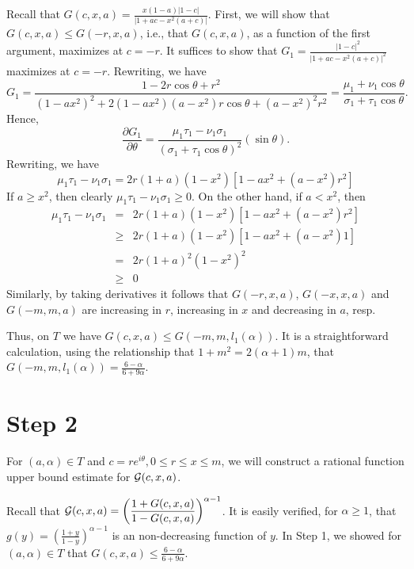 \documentclass[12pt]{article}
\newcommand{\ds}{\displaystyle}
\begin{document}
Recall that ${\ds G(c,x,a) = \frac{x(1-a)|1-c|}{|1+ac-x^2(a+c)|}}$.   
First, we will show that ${ G}(c,x,a) \le { G}(-r,x,a)$, i.e., that ${ G}(c,x,a)$, as a function of the first argument, maximizes at $c = -r$.  
It suffices to show that ${\ds G_1 = \frac{|1-c|^2}{|1+ac-x^2(a+c)|^2}}$ maximizes at $c = -r$.  
Rewriting, we have 
$$
G_1 = \frac{1-2r\cos\theta + r^2}{(1-ax^2)^2 + 2(1-ax^2)(a-x^2)r\cos\theta + (a-x^2)^2r^2} = \frac{\mu_1 + \nu_1 \cos\theta}{\sigma_1 + \tau_1 \cos \theta}.
$$
Hence, 
$$
\frac{\partial G_1}{\partial \theta} = \frac{\mu_1\tau_1 - \nu_1\sigma_1}{(\sigma_1 + \tau_1 \cos\theta)^2}(\sin\theta).
$$
Rewriting, we have
$$
\mu_1\tau_1 - \nu_1\sigma_1 = 2r(1+a)(1-x^2)[1-ax^2 + (a-x^2)r^2]
$$
If $a \ge x^2$, then clearly $\mu_1\tau_1 - \nu_1\sigma_1 \ge 0$.  On the other hand, if $a < x^2$, then
\begin{eqnarray*}
\mu_1\tau_1 - \nu_1\sigma_1 &=& 2r(1+a)(1-x^2)[1-ax^2 + (a-x^2)r^2] \\
                    &\ge& 2r(1+a)(1-x^2)[1-ax^2 + (a-x^2)1] \\
                    &=& 2r (1+a)^2(1-x^2)^2 \\
                    &\ge& 0
\end{eqnarray*}
\vspace{0.05in}
Similarly, by taking derivatives it follows that ${ G}(-r,x,a)$, ${ G}(-x,x,a)$ and ${ G}(-m,m,a)$ are increasing in $r$, increasing in $x$ and decreasing in $a$, resp.

\vspace{0.05in}

Thus, on $T$ we have ${ G}(c,x,a) \le { G}(-m,m,l_1(\alpha))$.  It is a straightforward calculation, using the relationship that $1 + m^2 = 2(\alpha+1)m$, that 
${\ds {G}(-m,m,l_1(\alpha))= \frac{6-\alpha}{6+9\alpha}}$.  


\section{Step 2}

For $(a,\alpha) \in T$ and $c = re^{i\theta}, 0 \le r \le x \le m$, we will construct a rational function upper bound estimate for ${\ds {\cal G}(c,x,a)}$.  

Recall that ${\ds {\cal G}(c,x,a) = \left ( \frac{1+G(c,x,a)}{1-G(c,x,a)} \right ) ^{\alpha-1}}$. 
It is easily verified, for $\alpha \ge 1$, that 
${\ds g(y) = \left ( \frac{1+y}{1-y} \right ) ^{\alpha-1}}$  is an non-decreasing function of $y$. 
In Step 1, we showed for $(a,\alpha) \in T$ that ${\ds G(c,x,a) \le \frac{6-\alpha}{6+9\alpha}}$.
\end{document}
